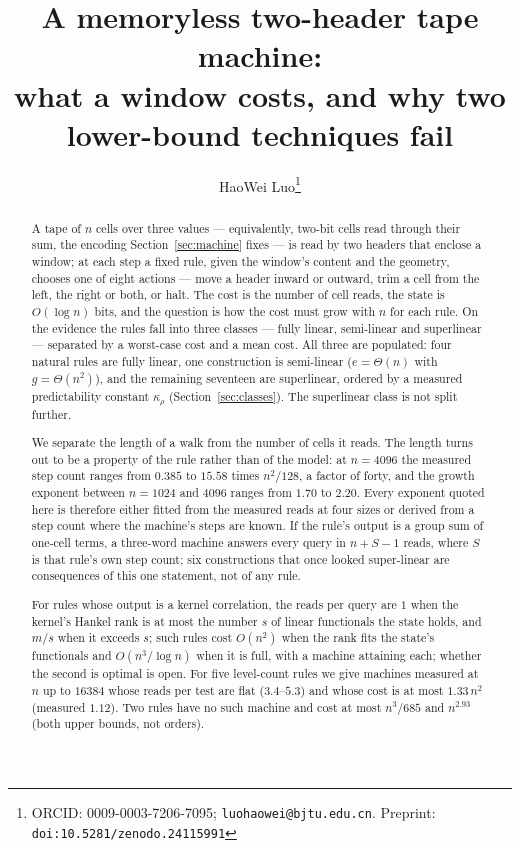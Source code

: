 \documentclass[11pt]{article}
\title{A memoryless two-header tape machine:\\ what a window costs, and why two lower-bound techniques fail}
\author{HaoWei Luo\thanks{ORCID: 0009-0003-7206-7095; \texttt{luohaowei@bjtu.edu.cn}. Preprint: \texttt{doi:10.5281/zenodo.24115991}}}
\date{}
\theoremstyle{remark}
\begin{document}
\maketitle

\begin{abstract}
A tape of $n$ cells over three values --- equivalently, two-bit cells read through their sum, the
encoding Section~\ref{sec:machine} fixes --- is read by two headers that enclose a window; at each step a
fixed rule, given the window's content and the geometry, chooses one of eight actions --- move a
header inward or outward, trim a cell from the left, the right or both, or halt. The cost is the
number of cell reads, the state is $O(\log n)$ bits, and the question is how the cost must grow with
$n$ for each rule. On the evidence the rules fall into three classes --- fully linear, semi-linear
and superlinear --- separated by a worst-case cost and a mean cost. All three are populated: four
natural rules are fully linear, one construction is semi-linear ($e=\Theta(n)$ with
$g=\Theta(n^{2})$), and the remaining seventeen are superlinear, ordered by a measured predictability constant
$\kappa_\rho$ (Section~\ref{sec:classes}).  The superlinear class is not split further.

We separate the length of a walk from the number of cells it reads. The length turns out to be a
property of the rule rather than of the model: at $n=4096$ the measured step count ranges from
$0.385$ to $15.58$ times $n^{2}/128$, a factor of forty, and the growth exponent between
$n=1024$ and $4096$ ranges from $1.70$ to $2.20$. Every exponent quoted here is therefore either fitted from the measured reads at four sizes or
derived from a step count where the machine's steps are known. If the rule's output is a group sum of one-cell
terms, a three-word machine answers every query in $n+S-1$ reads, where $S$ is that rule's own step
count; six constructions that once looked super-linear are consequences of this one statement, not of
any rule.

For rules whose output is a kernel correlation, the reads per query are $1$ when the kernel's Hankel
rank is at most the number $s$ of linear functionals the state holds, and $m/s$ when it exceeds $s$;
such rules cost $O(n^{2})$ when the rank fits the state's functionals and $O(n^{3}/\log n)$ when it is
full, with a machine attaining each; whether the second is optimal is open. For
five level-count rules we give machines measured at $n$ up to $16384$ whose reads per test are flat
($3.4$--$5.3$) and whose cost is at most $1.33\,n^{2}$ (measured $1.12$). Two rules have no such machine and cost at
most $n^{3}/685$ and $n^{2.93}$ (both upper bounds, not orders).


\end{abstract}
\end{document}
